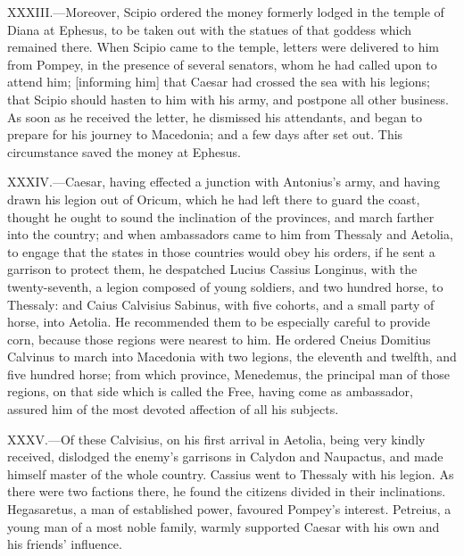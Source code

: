 XXXIII.—Moreover, Scipio ordered the money formerly lodged in the
temple of Diana at Ephesus, to be taken out with the statues of that
goddess which remained there. When Scipio came to the temple, letters
were delivered to him from Pompey, in the presence of several senators,
whom he had called upon to attend him; [informing him] that Caesar had
crossed the sea with his legions; that Scipio should hasten to him with
his army, and postpone all other business. As soon as he received the
letter, he dismissed his attendants, and began to prepare for his
journey to Macedonia; and a few days after set out. This circumstance
saved the money at Ephesus.

XXXIV.—Caesar, having effected a junction with Antonius's army, and
having drawn his legion out of Oricum, which he had left there to guard
the coast, thought he ought to sound the inclination of the provinces,
and march farther into the country; and when ambassadors came to him
from Thessaly and Aetolia, to engage that the states in those countries
would obey his orders, if he sent a garrison to protect them, he
despatched Lucius Cassius Longinus, with the twenty-seventh, a legion
composed of young soldiers, and two hundred horse, to Thessaly: and
Caius Calvisius Sabinus, with five cohorts, and a small party of horse,
into Aetolia. He recommended them to be especially careful to provide
corn, because those regions were nearest to him. He ordered Cneius
Domitius Calvinus to march into Macedonia with two legions, the eleventh
and twelfth, and five hundred horse; from which province, Menedemus, the
principal man of those regions, on that side which is called the Free,
having come as ambassador, assured him of the most devoted affection of
all his subjects.

XXXV.—Of these Calvisius, on his first arrival in Aetolia, being very
kindly received, dislodged the enemy's garrisons in Calydon and
Naupactus, and made himself master of the whole country. Cassius went to
Thessaly with his legion. As there were two factions there, he found the
citizens divided in their inclinations. Hegasaretus, a man of
established power, favoured Pompey's interest. Petreius, a young man of
a most noble family, warmly supported Caesar with his own and his
friends' influence.

